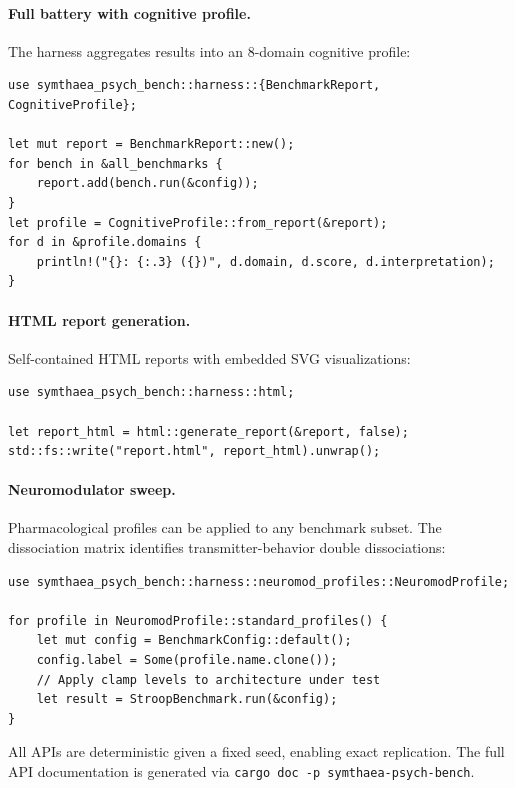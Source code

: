\documentclass[11pt,letterpaper]{article}
\begin{document}
\paragraph{Full battery with cognitive profile.} The harness aggregates results into an 8-domain cognitive profile:

\begin{lstlisting}
use symthaea_psych_bench::harness::{BenchmarkReport, CognitiveProfile};

let mut report = BenchmarkReport::new();
for bench in &all_benchmarks {
    report.add(bench.run(&config));
}
let profile = CognitiveProfile::from_report(&report);
for d in &profile.domains {
    println!("{}: {:.3} ({})", d.domain, d.score, d.interpretation);
}
\end{lstlisting}

\paragraph{HTML report generation.} Self-contained HTML reports with embedded SVG visualizations:

\begin{lstlisting}
use symthaea_psych_bench::harness::html;

let report_html = html::generate_report(&report, false);
std::fs::write("report.html", report_html).unwrap();
\end{lstlisting}

\paragraph{Neuromodulator sweep.} Pharmacological profiles can be applied to any benchmark subset. The dissociation matrix identifies transmitter-behavior double dissociations:

\begin{lstlisting}
use symthaea_psych_bench::harness::neuromod_profiles::NeuromodProfile;

for profile in NeuromodProfile::standard_profiles() {
    let mut config = BenchmarkConfig::default();
    config.label = Some(profile.name.clone());
    // Apply clamp levels to architecture under test
    let result = StroopBenchmark.run(&config);
}
\end{lstlisting}

All APIs are deterministic given a fixed seed, enabling exact replication. The full API documentation is generated via \texttt{cargo doc -p symthaea-psych-bench}.
\end{document}
